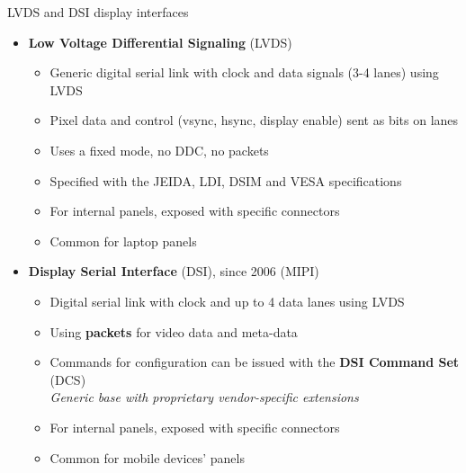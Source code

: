 \begin{frame}{LVDS and DSI display interfaces}


  \begin{itemize}
  \item \textbf{Low Voltage Differential Signaling} (LVDS)
    \begin{itemize}
    \item Generic digital serial link with clock and data signals (3-4 lanes) using LVDS
    \item Pixel data and control (vsync, hsync, display enable) sent as bits on lanes
    \item Uses a fixed mode, no DDC, no packets
    \item Specified with the JEIDA, LDI, DSIM and VESA specifications
    \item For internal panels, exposed with specific connectors
    \item Common for laptop panels
    \end{itemize}
  \end{itemize}
  \begin{itemize}
  \item \textbf{Display Serial Interface} (DSI), since 2006 (MIPI)
    \begin{itemize}
    \item Digital serial link with clock and up to 4 data lanes using LVDS
    \item Using \textbf{packets} for video data and meta-data
    \item Commands for configuration can be issued with the \textbf{DSI Command Set} (DCS)\\
    \textit{Generic base with proprietary vendor-specific extensions}
    \item For internal panels, exposed with specific connectors
    \item Common for mobile devices' panels
    \end{itemize}
  \end{itemize}
\end{frame}

